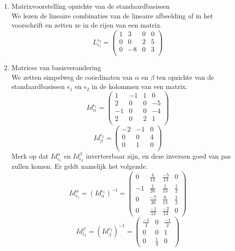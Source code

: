 \documentclass[lineaire_algebra_oplossingen.tex]{subfiles}
\begin{document}
\begin{enumerate}
\item Matrixvoorstelling opzichte van de standaardbasissen\\
We lezen de lineaire combinaties van de lineaire afbeelding af in het voorschrift en zetten ze in de rijen van een matrix.
\[
L_{\epsilon_1}^{\epsilon_2} = 
\begin{pmatrix}
1 & 3 & 0 & 0\\
0 & 0 & 2 & 5\\
0 & -8 &0 & 3\\
\end{pmatrix}
\]

\item Matrices van basisverandering\\
We zetten simpelweg de co\"ordinaten van $\alpha$ en $\beta$ ten opzichte van de standaardbasissen $\epsilon_1$ en $\epsilon_2$ in de kolommen van een matrix.
\[
Id_{\alpha}^{\epsilon_1} =
\begin{pmatrix}
1 & -1 & 1 & 0\\
2 & 0 & 0 & -5\\
-1 & 0 & 0 & -4\\
2 & 0 & 2 & 1\\
\end{pmatrix}
\]
\[
Id_{\beta}^{\epsilon_2} =
\begin{pmatrix}
-2 & -1 & 0\\
0 & 0 & 4\\
0 & 1 & 0\\
\end{pmatrix}
\]
Merk op dat $Id_{\epsilon_1}^{\alpha}$ en $Id_{\epsilon_2}^{\beta}$ inverteerbaar zijn, en deze inversen goed van pas zullen komen. Er geldt namelijk het volgende.
\[
Id_{\epsilon_1}^{\alpha}
= (Id_{\alpha}^{\epsilon_1})^{-1}
=
\begin{pmatrix}
0 & \frac{4}{13} & \frac{-5}{13} & 0\\
-1 & \frac{1}{26} & \frac{1}{13} & \frac{1}{2}\\
0 & \frac{-7}{26} & \frac{6}{13} & \frac{1}{2}\\
0 & \frac{-1}{13} & \frac{-2}{13} &0
\end{pmatrix}
\]
\[
Id_{\epsilon_2}^{\beta}
= (Id_{\beta}^{\epsilon_2})^{-1}
= 
\begin{pmatrix}
\frac{-1}{2} & 0 & \frac{-1}{2}\\
0 & 0 & 1\\
0 & \frac{1}{4} & 0
\end{pmatrix}
\]


\end{enumerate}
\end{document}
